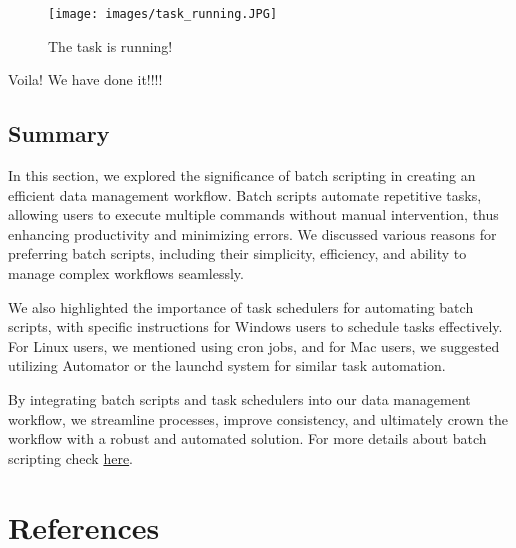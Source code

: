 \documentclass[
  letterpaper,
  DIV=11,
  numbers=noendperiod]{scrreprt}
\begin{document}
\begin{figure}[H]

{\centering \texttt{[image: images/task\_running.JPG]}

}

\caption{The task is running!}

\end{figure}%

Voila! We have done it!!!!

\section{Summary}\label{summary-4}

In this section, we explored the significance of batch scripting in
creating an efficient data management workflow. Batch scripts automate
repetitive tasks, allowing users to execute multiple commands without
manual intervention, thus enhancing productivity and minimizing errors.
We discussed various reasons for preferring batch scripts, including
their simplicity, efficiency, and ability to manage complex workflows
seamlessly.

We also highlighted the importance of task schedulers for automating
batch scripts, with specific instructions for Windows users to schedule
tasks effectively. For Linux users, we mentioned using cron jobs, and
for Mac users, we suggested utilizing Automator or the launchd system
for similar task automation.

By integrating batch scripts and task schedulers into our data
management workflow, we streamline processes, improve consistency, and
ultimately crown the workflow with a robust and automated solution. For
more details about batch scripting check
\href{https://tutorialreference.com/batch-scripting/batch-script-tutorial}{here}.


\chapter*{References}\label{references}

\end{document}
